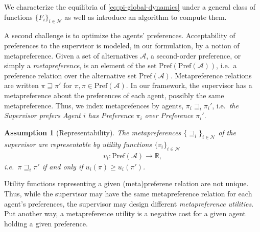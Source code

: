 \documentclass[conference]{ieeeconf}
\newcommand{\R}{\mathbb{R}}
\newcommand{\N}{\mathcal{N}}
\newcommand{\A}{\mathcal{A}}
\renewcommand{\P}{\mathrm{Pref}}
\newcommand{\metaprefers}{\sqsupseteq}
\renewcommand{\geq}{\geqslant}
\newtheorem{assumption}{Assumption}
\begin{document}
We characterize the equilibria of \eqref{eq:pi-global-dynamics} under a general class of functions $\{ F_i \}_{i \in \N}$ as well as introduce an algorithm to compute them.

A second challenge is to optimize the agents' preferences.
Acceptability of preferences to the supervisor is modeled, in our formulation, by a notion of metapreference. Given a set of alternatives $\A$, a second-order preference, or simply a \emph{metapreference}, is an element of the set $\P(\P(\A))$, i.e.~a preference relation over the alternative set $\P(\A)$. Metapreference relations are written $\pi \metaprefers \pi'$ for $\pi, \pi \in \P(\A)$. In our framework, the supervisor has a metapreference about the preferences of each agent, possibly the same metapreference. Thus, we index metaprefences by agents, $\pi_i \metaprefers_i \pi_i'$, i.e.~\emph{the Supervisor prefers Agent $i$ has Preference $\pi_i$ over Preference $\pi_i'$}.

\begin{assumption}[Representability] \label{ass:represent}
    The metapreferences $\{ \metaprefers_i \}_{i \in \N}$ of the supervisor are representable by utility functions $\{ v_i \}_{i \in \N}$
    \begin{align}
        v_i : \P(\A) \to \R, \label{eq:utility-meta}
    \end{align}
    i.e.~$\pi \metaprefers_i \pi'$ if and only if $u_i(\pi) \geq u_i(\pi')$.
\end{assumption}

Utility functions representing a given (meta)preferene relation are not unique. Thus, while the supervisor may have the same metapreference relation for each agent's preferences, the supervisor may design different \emph{metapreference utilities}. Put another way, a metapreference utility is a negative cost for a given agent holding a given preference.
\end{document}
